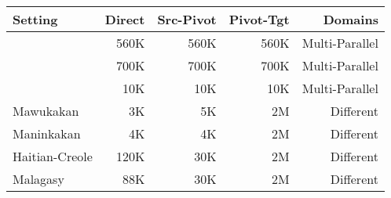 \begin{tabular}{lrrrr}
\toprule
Setting & Direct & Src-Pivot & Pivot-Tgt & Domains\\
\toprule
~\cite{Utiyama:07} & 560K & 560K & 560K & Multi-Parallel\\
~\cite{Cohn:07} & 700K & 700K & 700K & Multi-Parallel\\
~\cite{Cohn:07} & 10K & 10K & 10K & Multi-Parallel\\
\midrule
Mawukakan & 3K & 5K & 2M & Different\\
Maninkakan & 4K & 4K & 2M  & Different \\ 
Haitian-Creole & 120K & 30K & 2M & Different\\
Malagasy & 88K & 30K & 2M & Different\\
\bottomrule
\end{tabular}
 
